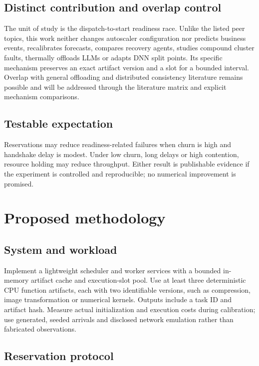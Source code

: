 \documentclass[11pt,a4paper]{article}
\begin{document}
\subsection{Distinct contribution and overlap control}

The unit of study is the dispatch-to-start readiness race. Unlike the listed peer topics, this work neither changes autoscaler configuration nor predicts business events, recalibrates forecasts, compares recovery agents, studies compound cluster faults, thermally offloads LLMs or adapts DNN split points. Its specific mechanism preserves an exact artifact version and a slot for a bounded interval. Overlap with general offloading and distributed consistency literature remains possible and will be addressed through the literature matrix and explicit mechanism comparisons.

\subsection{Testable expectation}

Reservations may reduce readiness-related failures when churn is high and handshake delay is modest. Under low churn, long delays or high contention, resource holding may reduce throughput. Either result is publishable evidence if the experiment is controlled and reproducible; no numerical improvement is promised.

\section{Proposed methodology}

\subsection{System and workload}

Implement a lightweight scheduler and worker services with a bounded in-memory artifact cache and execution-slot pool. Use at least three deterministic CPU function artifacts, each with two identifiable versions, such as compression, image transformation or numerical kernels. Outputs include a task ID and artifact hash. Measure actual initialization and execution costs during calibration; use generated, seeded arrivals and disclosed network emulation rather than fabricated observations.

\subsection{Reservation protocol}
\end{document}

